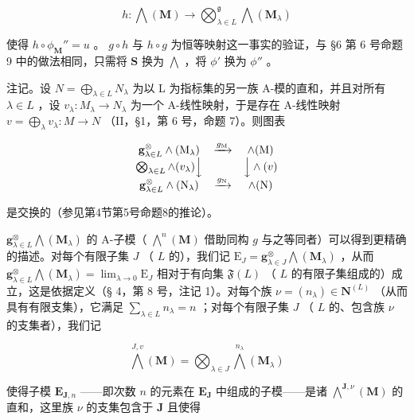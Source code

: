 \[
h: \bigwedge (\mathbf {M}) \rightarrow \bigotimes_ {\lambda \in L} ^ {\mathfrak {g}} \bigwedge (\mathbf {M} _ {\lambda})
\]

使得 \(h \circ \phi_{\mathbf{M}}'' = u\) 。 \(g \circ h\) 与 \(h \circ g\) 为恒等映射这一事实的验证，与 §6 第 6 号命题 9 中的做法相同，只需将 \(\mathbf{S}\) 换为 \(\bigwedge\) ，将 \(\phi'\) 换为 \(\phi''\) 。

注记。设 \(N = \bigoplus_{\lambda \in L} N_{\lambda}\) 为以 L 为指标集的另一族 A-模的直和，并且对所有 \(\lambda \in L\) ，设 \(v_{\lambda}: M_{\lambda} \to N_{\lambda}\) 为一个 A-线性映射，于是存在 A-线性映射 \(v = \bigoplus_{\lambda} v_{\lambda}: M \to N\) （II，§1，第 6 号，命题 7）。则图表

\[
\begin{array}{c c c} \mathbf {g} _ {\lambda \in L} ^ {\otimes} \wedge (\mathrm{M} _ {\lambda}) & \xrightarrow {g _ {\mathrm{M}}} & \wedge (\mathrm{M}) \\ \bigotimes_ {\lambda \in L} \wedge (v _ {\lambda}) \Big \downarrow & & \Big \downarrow \wedge (v) \\ \mathbf {g} _ {\lambda \in L} ^ {\otimes} \wedge (\mathrm{N} _ {\lambda}) & \xrightarrow {g _ {\mathrm{N}}} & \wedge (\mathrm{N}) \end{array}
\]

是交换的（参见第4节第5号命题8的推论）。

\(\mathbf{g}_{\lambda \in L}^{\otimes} \bigwedge (\mathbf{M}_{\lambda})\) 的 A-子模（ \(\bigwedge^{n}(\mathbf{M})\) 借助同构 \(g\) 与之等同者）可以得到更精确的描述。对每个有限子集 \(J\) （ \(L\) 的），我们记 \(\mathrm{E}_{J} = \mathbf{g}_{\lambda \in J}^{\otimes} \bigwedge (\mathbf{M}_{\lambda})\) ，从而 \(\mathbf{g}_{\lambda \in L}^{\otimes} \bigwedge (\mathbf{M}_{\lambda}) = \lim_{\lambda \to 0} \mathrm{E}_{J}\) 相对于有向集 \(\mathfrak{F}(L)\) （ \(L\) 的有限子集组成的）成立，这是依据定义（§ 4，第 8 号，注记 1）。对每个族 \(\nu = (n_{\lambda}) \in \mathbf{N}^{(L)}\) （从而具有有限支集），它满足 \(\sum_{\lambda \in L} n_{\lambda} = n\) ；对每个有限子集 \(J\) （ \(L\) 的、包含族 \(\nu\) 的支集者），我们记

\[
\bigwedge^ {J, v} (\mathbf {M}) = \bigotimes_ {\lambda \in J} \bigwedge^ {n _ {\lambda}} (\mathbf {M} _ {\lambda})\tag{16}
\]

使得子模 \(\mathbf{E}_{\mathbf{J},n}\) ——即次数 \(n\) 的元素在 \(\mathbf{E}_{\mathbf{J}}\) 中组成的子模——是诸 \(\bigwedge^{\mathbf{J},\nu}(\mathbf{M})\) 的直和，这里族 \(\nu\) 的支集包含于 \(\mathbf{J}\) 且使得

